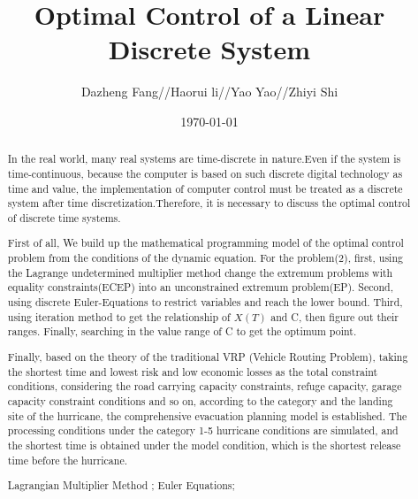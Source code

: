 \documentclass{mcmthesis}
\title{\large Optimal Control of a Linear Discrete System}
\author{Dazheng Fang//Haorui li//Yao Yao//Zhiyi Shi }
\date{\today}
\begin{document}
\begin{abstract}

In the real world, many real systems are time-discrete in nature.Even if the system is time-continuous, because the computer is based on such discrete digital technology as time and value, the implementation of computer control must be treated as a discrete system after time discretization.Therefore, it is necessary to discuss the optimal control of discrete time systems.

First of all, We build up the mathematical programming model of the optimal control problem from the conditions of the dynamic equation.
For the problem(2), first,  using the Lagrange undetermined multiplier method change the extremum problems with equality constraints(ECEP) into an unconstrained extremum problem(EP). Second, using discrete Euler-Equations to restrict variables and reach the lower bound. Third, using iteration method to get the relationship of $X(T)$ and C, then figure out their  ranges. Finally, searching in the value range of C to get the optimum point.%


Finally, based on the theory of the traditional VRP (Vehicle Routing Problem), taking the shortest time and lowest risk and low economic losses as the total constraint conditions, considering the road carrying capacity constraints, refuge capacity, garage capacity constraint conditions and so on, according to the category and the landing site of the hurricane, the comprehensive evacuation planning model is established. The processing conditions under the category 1-5 hurricane conditions are simulated, and the shortest time is obtained under the model condition, which is the shortest release time before the hurricane.

\begin{keywords}
Lagrangian Multiplier Method ; Euler Equations; 
\end{keywords}
\end{abstract}
\maketitle
\newpage                                                          %
\begin{adjustwidth}{-1cm}{0cm}

\setcounter{tocdepth}{3}
\thispagestyle{empty}
\tableofcontents                                                  %

\end{adjustwidth}
\end{document}
